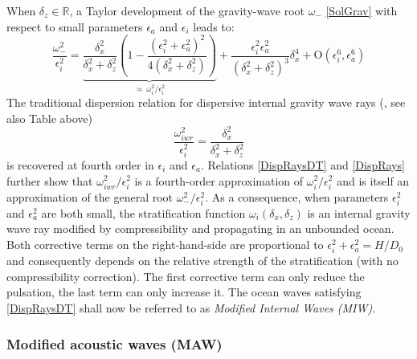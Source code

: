 \documentclass[a4paper,11pt]{article}
\begin{document}
When $\delta_z\in \mathbb{R}$, a Taylor development of the gravity-wave root $\omega_{-}$ \ref{SolGrav} with respect to small parameters $\epsilon_a$ and $\epsilon_i$ leads to:
\begin{equation}
	\label{DispRaysDT}
		\frac{\omega_-^2}{\epsilon_i^2} =\underbrace{
		\frac{\delta_x^2}{\delta_x^2+\delta_z^2}
		\left(1-\frac{(\epsilon_i^2+\epsilon_a^2)^2}{4(\delta_x^2+\delta_z^2)}\right)}_{\approx\ \omega_i^2/\epsilon_i^2}
		+\frac{\epsilon_i^2\epsilon_a^2}{(\delta_x^2+\delta_z^2)^3}\delta_x^4
		+\mathrm{O}	(\epsilon_i^{6},\epsilon_a^{6})
\end{equation}
The traditional dispersion relation for dispersive internal gravity wave rays (\cite{gill_1982}, see also Table  above)
\begin{equation}
	\frac{\omega_{iwr}^2}{\epsilon_i^2}=\frac{ \delta_x^2}{\delta_x^2+\delta_z^2}
	\label{DispRays}
\end{equation}
is recovered at fourth order in $\epsilon_i$ and $\epsilon_a$. Relations \ref{DispRaysDT} and \ref{DispRays} further show that $\omega_{iwr}^2/\epsilon_i^2$ is a fourth-order approximation of $\omega_i^2/\epsilon_i^2$ and is itself an approximation of the general root $\omega_-^2/\epsilon_i^2$.
As a consequence, when parameters $\epsilon_i^2$ and $\epsilon_a^2$  are both small, the stratification function $\omega_i(\delta_x,\delta_z)$ is an internal gravity wave ray modified by compressibility and propagating in an unbounded ocean. Both corrective terms on the right-hand-side are proportional to $\epsilon_i^2+\epsilon_a^2=H/D_0$ and consequently depends on the relative strength of the stratification (with no compressibility correction). The first corrective term can only reduce the pulsation, the last term can only increase it. The ocean waves satisfying \ref{DispRaysDT} shall now be referred to as \textit{Modified Internal Waves (MIW)}.

\subsubsection{Modified acoustic waves (MAW)}

\end{document}
